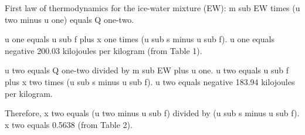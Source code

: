 First law of thermodynamics for the ice-water mixture (EW):  
m sub EW times (u two minus u one) equals Q one-two.  

u one equals u sub f plus x one times (u sub s minus u sub f).  
u one equals negative 200.03 kilojoules per kilogram (from Table 1).  

u two equals Q one-two divided by m sub EW plus u one.  
u two equals u sub f plus x two times (u sub s minus u sub f).  
u two equals negative 183.94 kilojoules per kilogram.  

Therefore, x two equals (u two minus u sub f) divided by (u sub s minus u sub f).  
x two equals 0.5638 (from Table 2).